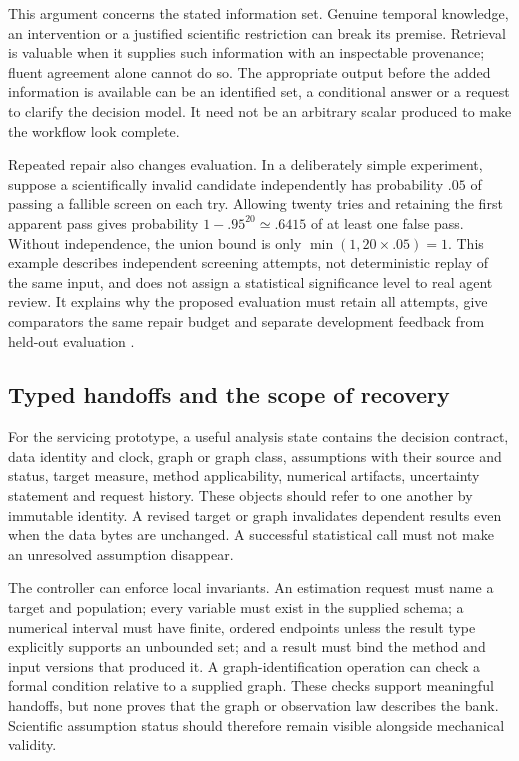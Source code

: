 This argument concerns the stated information set. Genuine temporal knowledge,
an intervention or a justified scientific restriction can break its premise.
Retrieval is valuable when it supplies such information with an inspectable
provenance; fluent agreement alone cannot do so. The appropriate output before
the added information is available can be an identified set, a conditional
answer or a request to clarify the decision model. It need not be an arbitrary
scalar produced to make the workflow look complete.

Repeated repair also changes evaluation. In a deliberately simple experiment,
suppose a scientifically invalid candidate independently has probability $.05$
of passing a fallible screen on each try. Allowing twenty tries and retaining
the first apparent pass gives probability
$1-.95^{20}\simeq.6415$ of at least one false pass. Without independence, the
union bound is only $\min(1,20\times.05)=1$. This example describes independent
screening attempts, not deterministic replay of the same input, and does not
assign a statistical significance level to real agent review. It explains why
the proposed evaluation must retain all attempts, give comparators the same
repair budget and separate development feedback from held-out evaluation
\citep{exec13_architecture_exact}.

\subsection{Typed handoffs and the scope of recovery}

For the servicing prototype, a useful analysis state contains the decision
contract, data identity and clock, graph or graph class, assumptions with their
source and status, target measure, method applicability, numerical artifacts,
uncertainty statement and request history. These objects should refer to one
another by immutable identity. A revised target or graph invalidates dependent
results even when the data bytes are unchanged. A successful statistical call
must not make an unresolved assumption disappear.

The controller can enforce local invariants. An estimation request must name a
target and population; every variable must exist in the supplied schema; a
numerical interval must have finite, ordered endpoints unless the result type
explicitly supports an unbounded set; and a result must bind the method and
input versions that produced it. A graph-identification operation can check a
formal condition relative to a supplied graph. These checks support meaningful
handoffs, but none proves that the graph or observation law describes the bank.
Scientific assumption status should therefore remain visible alongside
mechanical validity.

